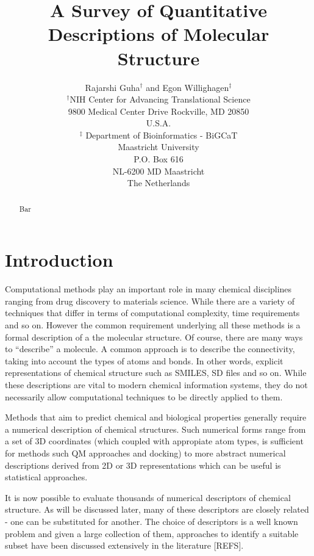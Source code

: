\documentclass[letterpaper, 12pt]{article}
\begin{document}
\title{A Survey of Quantitative Descriptions of Molecular Structure}
\author{Rajarshi Guha${}^{\dagger}$ and Egon Willighagen${}^{\ddagger}$\\
${}^{\dagger}$NIH Center for Advancing Translational Science\\9800 Medical
Center Drive  Rockville, MD 20850 \\U.S.A.\\
${}^{\ddagger}$ Department of Bioinformatics - BiGCaT\\Maastricht University\\P.O. Box 616\\NL-6200 MD Maastricht\\The Netherlands
}
\date{}

\maketitle
\begin{abstract}
Bar
\end{abstract}

\section{Introduction}

Computational methods play an important role in many chemical
disciplines ranging from drug discovery to materials science. While
there are a variety of techniques that differ in terms of
computational complexity, time requirements and so on. However the
common requirement underlying all these methods is a formal
description of a the molecular structure. Of course, there are many
ways to ``describe'' a molecule. A common approach is to describe the
connectivity, taking into account the types of atoms and bonds. In
other words, explicit representations of chemical structure such as
SMILES, SD files and so on. While these descriptions are vital to
modern chemical information systems, they do not necessarily allow
computational techniques to be directly applied to them.

Methods that aim to predict chemical and biological properties
generally require a numerical description of chemical structures. Such
numerical forms range from a set of 3D coordinates (which coupled with
appropiate atom types, is sufficient for methods such QM approaches
and docking) to more abstract numerical descriptions derived from 2D
or 3D representations which can be useful is statistical approaches.

It is now possible to evaluate thousands of numerical descriptors of
chemical structure. As will be discussed later, many of these
descriptors are closely related - one can be substituted for
another. The choice of descriptors is a well known problem and given a
large collection of them, approaches to identify a suitable subset  
have been discussed extensively in the literature [REFS]. 
\end{document}
